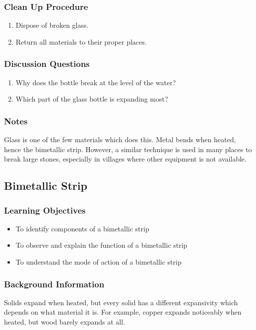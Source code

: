 \subsubsection*{Clean Up Procedure}
\begin{enumerate}
\item{Dispose of broken glass.}
\item{Return all materials to their proper places.}
\end{enumerate}

\subsubsection*{Discussion Questions}
\begin{enumerate}
\item{Why does the bottle break at the level of the water?}
\item{Which part of the glass bottle is expanding most?}
\end{enumerate}

\subsubsection*{Notes}
Glass is one of the few materials which does this.  Metal bends when heated, hence the bimetallic strip.  However, a similar technique is used in many places to break large stones, especially in villages where other equipment is not available.


\subsection{Bimetallic Strip}

\subsubsection*{Learning Objectives}
\begin{itemize}
\item{To identify components of a bimetallic strip} 
\item{To observe and explain the function of a bimetallic strip} 
\item{To understand the mode of action of a bimetallic strip} 
\end{itemize}

\subsubsection*{Background Information}
Solids expand when heated, but every solid has a different expansivity which depends on what material it is. For example, copper expands noticeably when heated, but wood barely expands at all.  

